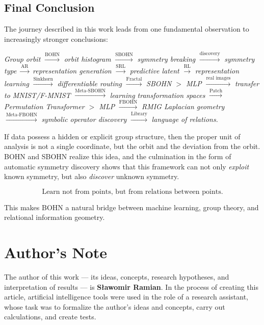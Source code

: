 \documentclass[11pt,a4paper]{report}
\begin{document}
\subsection{Final Conclusion}

The journey described in this work leads from one fundamental observation to increasingly stronger conclusions:

\begin{center}
\emph{Group orbit} $\xrightarrow{\text{BOHN}}$ \emph{orbit histogram} $\xrightarrow{\text{SBOHN}}$ \emph{symmetry breaking} $\xrightarrow{\text{discovery}}$ \emph{symmetry type} $\xrightarrow{\text{AR}}$ \emph{representation generation} $\xrightarrow{\text{SRL}}$ \emph{predictive latent} $\xrightarrow{\text{RL}}$ \emph{representation learning} $\xrightarrow{\text{Sinkhorn}}$ \emph{differentiable routing} $\xrightarrow{\text{Fractal}}$ \emph{SBOHN $>$ MLP} $\xrightarrow{\text{real images}}$ \emph{transfer to MNIST/F-MNIST} $\xrightarrow{\text{Meta-SBOHN}}$ \emph{learning transformation spaces} $\xrightarrow{\text{Patch}}$ \emph{Permutation Transformer $>$ MLP} $\xrightarrow{\text{FBOHN}}$ \emph{RMIG Laplacian geometry} $\xrightarrow{\text{Meta-FBOHN}}$ \emph{symbolic operator discovery} $\xrightarrow{\text{Library}}$ \emph{language of relations.}
\end{center}

If data possess a hidden or explicit group structure, then the proper unit of analysis is not a single coordinate, but the orbit and the deviation from the orbit. BOHN and SBOHN realize this idea, and the culmination in the form of automatic symmetry discovery shows that this framework can not only \emph{exploit} known symmetry, but also \emph{discover} unknown symmetry.

\[
\text{Learn not from points, but from relations between points.}
\]

This makes BOHN a natural bridge between machine learning, group theory, and relational information geometry.

\vfill

\section*{Author's Note}

The author of this work --- its ideas, concepts, research hypotheses, and interpretation of results --- is \textbf{Sławomir Ramian}. In the process of creating this article, artificial intelligence tools were used in the role of a research assistant, whose task was to formalize the author's ideas and concepts, carry out calculations, and create tests.
\end{document}
